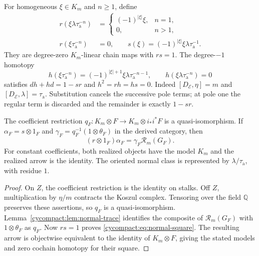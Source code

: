 For homogeneous $\xi\in K_m$ and $n\geq1$, define
\begin{equation}\label{cycompact:eq:normal-residue}
\begin{aligned}
 r(\xi\lambda\tau_{\mathrm a}^{-n})
 &=\begin{cases}(-1)^{|\xi|}\xi,&n=1,\\0,&n>1,\end{cases}\\
 r(\xi\tau_{\mathrm a}^{-n})&=0,\qquad
 s(\xi)=(-1)^{|\xi|}\xi\lambda\tau_{\mathrm a}^{-1}.
\end{aligned}
\end{equation}
They are degree-zero $K_m$-linear chain maps with
$rs=1$. The degree-$-1$ homotopy
\[
 h(\xi\tau_{\mathrm a}^{-n})
 =(-1)^{|\xi|+1}\xi\lambda\tau_{\mathrm a}^{-n-1},
 \qquad h(\xi\lambda\tau_{\mathrm a}^{-n})=0
\]
satisfies $dh+hd=1-sr$ and $h^2=rh=hs=0$.
Indeed $[D_{\mathcal E},\eta]=m$ and
$[D_{\mathcal E},\lambda]=\tau_{\mathrm a}$.
Substitution cancels the successive pole terms;
at pole one the regular term is discarded and
the remainder is exactly $1-sr$.

\begin{proposition}\label{cycompact:prop:normal-square}
The coefficient restriction
$q_F:K_m\otimes F\to K_m\otimes i_*i^*F$ is a
quasi-isomorphism. If
$\alpha_F=s\otimes1_F$ and
$\gamma_F=q_F^{-1}(1\otimes\theta_F)$ in the derived
category, then
\begin{equation}\label{cycompact:eq:normal-square}
 (r\otimes1_F)\alpha_F=\gamma_F\mathcal R_m(G_F).
\end{equation}
For constant coefficients, both realized objects
have the model $K_m$ and the realized arrow is the
identity. The oriented normal class is represented
by $\lambda/\tau_{\mathrm a}$, with residue $1$.
\end{proposition}

\begin{proof}
On $Z$, the coefficient restriction is the identity
on stalks. Off $Z$, multiplication by $\eta/m$
contracts the Koszul complex. Tensoring over the
field $\mathbb Q$ preserves these assertions,
so $q_F$ is a quasi-isomorphism.
Lemma~\ref{cycompact:lem:normal-trace} identifies
the composite of $\mathcal R_m(G_F)$ with
$1\otimes\theta_F$ as $q_F$.
Now $rs=1$ proves \eqref{cycompact:eq:normal-square}.
The resulting arrow is objectwise equivalent to
the identity of $K_m\otimes F$, giving the stated
models and zero cochain homotopy for their square.
\end{proof}


